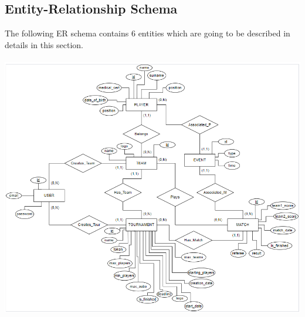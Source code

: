\subsection{Entity-Relationship Schema}
The following ER schema contains 6 entities which are going to be described in details in this section.\\ \\

\includegraphics[scale = 0.55]{sections/DLL/ERSchema.png}\\
\newpage

